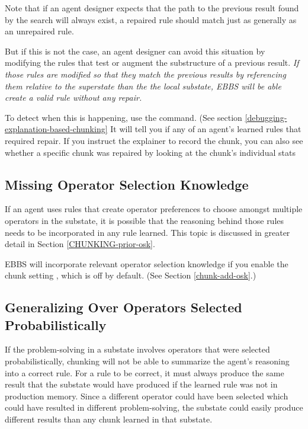 Note that if an agent designer expects that the path to the previous result found by the search will always exist, a repaired rule should match just as generally as an unrepaired rule.

But if this is not the case, an agent designer can avoid this situation by modifying the rules that test or augment the substructure of a previous result.  \emph{If those rules are modified so that they match the previous results by referencing them relative to the superstate than the the local substate, EBBS will be able create a valid rule without any repair.}

To detect when this is happening, use the  command. (See section \ref{debugging-explanation-based-chunking} It will tell you if any of an agent's learned rules that required repair.  If you instruct the explainer to record the chunk, you can also see whether a specific chunk was repaired by looking at the chunk's individual stats

\subsection{Missing Operator Selection Knowledge}
\label{CHUNKING-subtleties-missing-osk}

If an agent uses rules that create operator preferences to choose amongst multiple operators in the substate, it is possible that the reasoning behind those rules needs to be incorporated in any rule learned.  This topic is discussed in greater detail in Section \ref{CHUNKING-prior-osk}.

EBBS will incorporate relevant operator selection knowledge if you enable the chunk setting , which is off by default. (See Section \ref{chunk-add-osk}.)

\subsection{Generalizing Over Operators Selected Probabilistically}

If the problem-solving in a substate involves operators that were selected probabilistically, chunking will not be able to summarize the agent's reasoning into a correct rule.  For a rule to be correct, it must always produce the same result that the substate would have produced if the learned rule was not in production memory.  Since a different operator could have been selected which could have resulted in different problem-solving, the substate could easily produce different results than any chunk learned in that substate.


